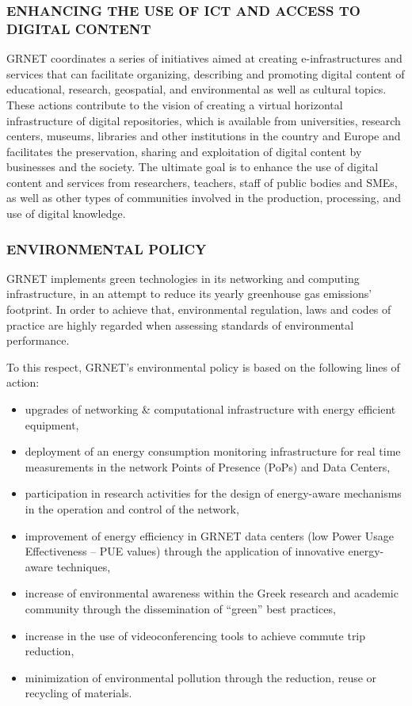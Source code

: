 \subsubsection{ENHANCING THE USE OF ICT AND ACCESS TO DIGITAL CONTENT}
GRNET coordinates a series of initiatives
aimed at creating e-infrastructures and services
that can facilitate organizing, describing and promoting
digital content of educational, research, geospatial,
and environmental as well as cultural topics.
These actions contribute to the vision
of creating a virtual horizontal infrastructure of digital repositories,
which is available from universities, research centers, museums, libraries
and other institutions in the country and Europe and
facilitates the preservation, sharing and exploitation
of digital content by businesses and the society.
The ultimate goal is to enhance the use of digital content
and services from researchers, teachers, staff of public bodies and SMEs,
as well as other types of communities involved in
the production, processing, and use of digital knowledge.

\subsubsection{ENVIRONMENTAL POLICY}
GRNET implements green technologies
in its networking and computing infrastructure,
in an attempt to reduce its yearly greenhouse gas emissions’ footprint.
In order to achieve that,
environmental regulation, laws and codes of practice
are highly regarded when assessing standards of environmental performance.\par

To this respect, GRNET’s environmental policy is based
on the following lines of action:

\begin{itemize}
	\item upgrades of networking \& computational infrastructure
	with energy efficient equipment,
	\item deployment of an energy consumption monitoring infrastructure
	for real time measurements in
	the network Points of Presence (PoPs) and Data Centers,
	\item participation in research activities for the design of
	energy-aware mechanisms in the operation and control of the network,
	\item improvement of energy efficiency in GRNET data centers
	(low Power Usage Effectiveness – PUE values) through
	the application of innovative energy-aware techniques,
	\item increase of environmental awareness within
	the Greek research and academic community
	through the dissemination of “green” best practices,
	\item increase in the use of videoconferencing tools
	to achieve commute trip reduction,
	\item minimization of environmental pollution through the reduction,
	reuse or recycling of materials.
\end{itemize}

